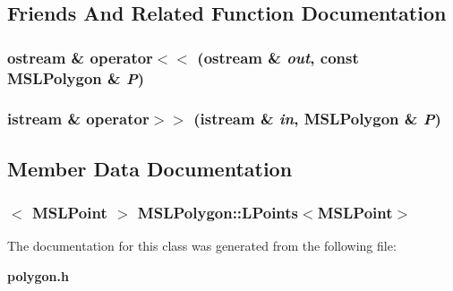 \subsection{Friends And Related Function Documentation}
\subsubsection{\setlength{\rightskip}{0pt plus 5cm}ostream \& operator$<$$<$ (ostream \& {\em out}, const MSLPolygon \& {\em P})\hspace{0.3cm}{\tt  [friend]}}\label{classMSLPolygon_l1}


\subsubsection{\setlength{\rightskip}{0pt plus 5cm}istream \& operator$>$$>$ (istream \& {\em in}, MSLPolygon \& {\em P})\hspace{0.3cm}{\tt  [friend]}}\label{classMSLPolygon_l0}




\subsection{Member Data Documentation}
\subsubsection{$<$ {\bf MSLPoint} $>$ MSLPolygon::LPoints$<${\bf MSLPoint}$>$}\label{classMSLPolygon_m0}




The documentation for this class was generated from the following file:\begin{CompactItemize}
\item 
{\bf polygon.h}\end{CompactItemize}
